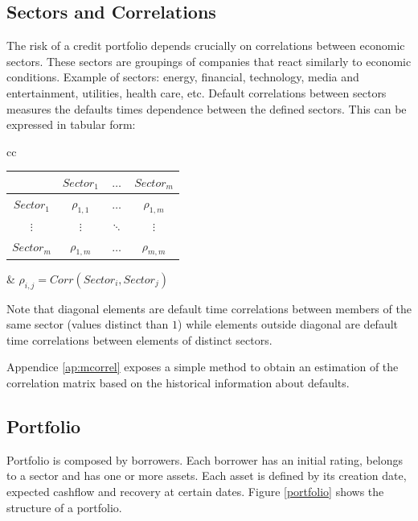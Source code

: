 \documentclass[a4paper,12pt,final]{article}
\begin{document}
\subsection{Sectors and Correlations}
\label{sectors}
The risk of a credit portfolio depends crucially on correlations between 
economic sectors. These sectors are groupings of companies that react similarly to 
economic conditions. Example of sectors: energy, financial, technology, 
media and entertainment, utilities, health care, etc. Default correlations between 
sectors measures the defaults times dependence between the defined sectors. This 
can be expressed in tabular form:

\begin{center}
\begin{tabular}[]{cc}
\begin{tabular}[]{c|ccc}
             & $Sector_1$   & $\dots$  & $Sector_{m}$ \\
\hline
$Sector_1$   & $\rho_{1,1}$ & $\dots$  & $\rho_{1,m}$ \\
$\vdots$     & $\vdots$     & $\ddots$ & $\vdots$     \\
$Sector_{m}$ & $\rho_{1,m}$ & $\dots$  & $\rho_{m,m}$ \\
\end{tabular}
&
\qquad $\rho_{i,j} = Corr(Sector_i, Sector_j)$
\end{tabular}
\end{center}

Note that diagonal elements are default time correlations between members of the 
same sector (values distinct than $1$) while elements outside diagonal are 
default time correlations between elements of distinct sectors.
\newline

Appendice \ref{ap:mcorrel} exposes a simple method to obtain an estimation of
the correlation matrix based on the historical information about defaults.

\subsection{Portfolio}
Portfolio is composed by borrowers. Each borrower has an initial rating, 
belongs to a sector and has one or more assets. Each asset
is defined by its creation date, expected cashflow and recovery at certain 
dates. Figure \ref{portfolio} shows the structure of a portfolio.
\newline
\end{document}
